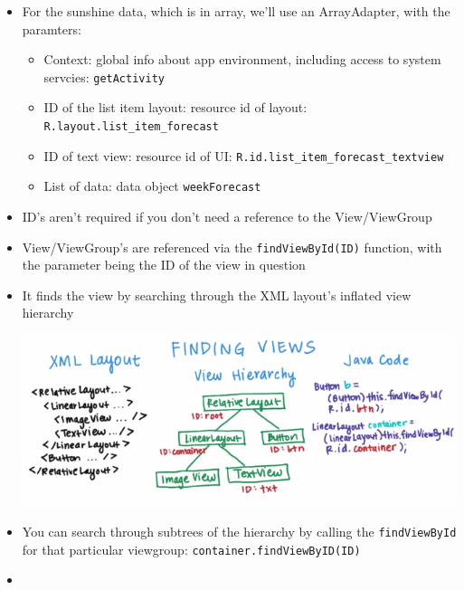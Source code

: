 \begin{itemize}[--]
	\item For the sunshine data, which is in array, we'll use an ArrayAdapter, with the paramters:
	\begin{itemize}[--]
		\item Context: global info about app environment, including access to system servcies: \texttt{getActivity\(\)}
		\item ID of the list item layout: resource id of layout: \texttt{R.layout.list\_item\_forecast}
		\item ID of text view: resource id of UI: \texttt{R.id.list\_item\_forecast\_textview}
		\item List of data: data object \texttt{weekForecast}
	\end{itemize}

	\item ID's aren't required if you don't need a reference to the View/ViewGroup
	\item View/ViewGroup's are referenced via the \texttt{findViewById(ID)} function, with the parameter being the ID of the view in question
	\item It finds the view by searching through the XML layout's inflated view hierarchy
	\begin{center}
		\includegraphics[scale=0.6]{sections/1/views.png}
	\end{center}

	\item You can search through subtrees of the hierarchy by calling the \texttt{findViewById} for that particular viewgroup: \texttt{container.findViewByID(ID)}
	\item 
\end{itemize}